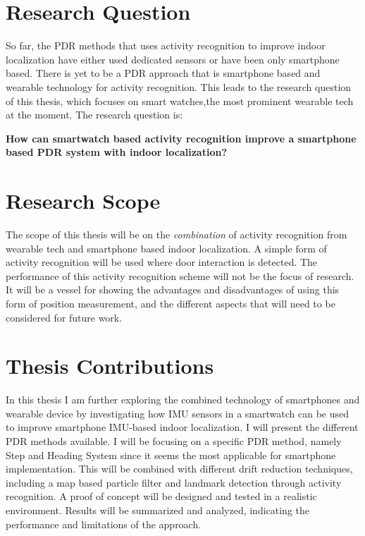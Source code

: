 \section{Research Question}

So far, the PDR methods that uses activity recognition to improve indoor localization have either used dedicated sensors or have been only smartphone based. There is yet to be a \ac{PDR} approach that is smartphone based and wearable technology for activity recognition. This leads to the research question of this thesis, which focuses on smart watches,the most prominent wearable tech at the moment. The research question is:

\textbf{How can smartwatch based activity recognition improve a smartphone based \ac{PDR} system with indoor localization?}

\section{Research Scope}

The scope of this thesis will be on the \textit{combination} of activity recognition from wearable tech and smartphone based indoor localization. A simple form of activity recognition will be used where door interaction is detected. The performance of this activity recognition scheme will not be the focus of research. It will be a vessel for showing the advantages and disadvantages of using this form of position measurement, and the different aspects that will need to be considered for future work.

\section{Thesis Contributions}

In this thesis I am further exploring the combined technology of smartphones and wearable device by investigating how IMU sensors in a smartwatch can be used to improve smartphone IMU-based indoor localization. I will present the different \ac{PDR} methods available. I will be focusing on a specific \ac{PDR} method, namely Step and Heading System since it seems the most applicable for smartphone implementation. This will be combined with different drift reduction techniques, including a map based particle filter and landmark detection through activity recognition. A proof of concept will be designed and tested in a realistic environment. Results will be summarized and analyzed, indicating the performance and limitations of the approach.


